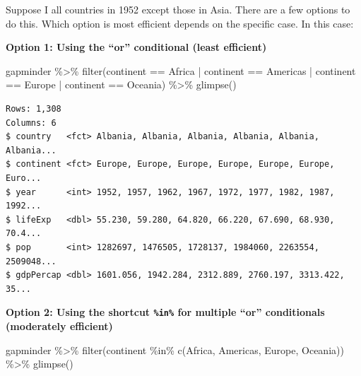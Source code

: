 \documentclass[
]{book}
\makeatletter
\newenvironment{Shaded}{\begin{snugshade}}{\end{snugshade}}
\newcommand{\FunctionTok}[1]{\textcolor[rgb]{0,0,0}{#1}}
\newcommand{\NormalTok}[1]{#1}
\newcommand{\SpecialCharTok}[1]{\textcolor[rgb]{0,0,0}{#1}}
\newcommand{\StringTok}[1]{\textcolor[rgb]{0.5,0.5,0.5}{#1}}
\newenvironment{kframe}{%
\medskip{}
\setlength{\fboxsep}{.8em}
 \def\at@end@of@kframe{}%
 \ifinner\ifhmode%
  \def\at@end@of@kframe{\end{minipage}}%
  \begin{minipage}{\columnwidth}%
 \fi\fi%
 \def\FrameCommand##1{\hskip\@totalleftmargin \hskip-\fboxsep
 \colorbox{shadecolor}{##1}\hskip-\fboxsep
     \hskip-\linewidth \hskip-\@totalleftmargin \hskip\columnwidth}%
 \MakeFramed {\advance\hsize-\width
   \@totalleftmargin\z@ \linewidth\hsize
   \@setminipage}}%
 {\par\unskip\endMakeFramed%
 \at@end@of@kframe}
\renewenvironment{Shaded}{\begin{kframe}}{\end{kframe}}
\makeatother
\begin{document}
Suppose I all countries in 1952 except those in Asia. There are a few options to do this. Which option is most efficient depends on the specific case. In this case:

\textbf{Option 1: Using the ``or'' conditional \texttt{\textbar{}} (least efficient)}

\begin{Shaded}
\begin{Highlighting}[]
\NormalTok{gapminder }\SpecialCharTok{\%\textgreater{}\%} 
  \FunctionTok{filter}\NormalTok{(continent }\SpecialCharTok{==} \StringTok{\textquotesingle{}Africa\textquotesingle{}} \SpecialCharTok{|}\NormalTok{ continent }\SpecialCharTok{==} \StringTok{\textquotesingle{}Americas\textquotesingle{}} \SpecialCharTok{|}\NormalTok{ continent }\SpecialCharTok{==} \StringTok{\textquotesingle{}Europe\textquotesingle{}} \SpecialCharTok{|}\NormalTok{ continent }\SpecialCharTok{==} \StringTok{\textquotesingle{}Oceania\textquotesingle{}}\NormalTok{) }\SpecialCharTok{\%\textgreater{}\%} 
  \FunctionTok{glimpse}\NormalTok{()}
\end{Highlighting}
\end{Shaded}

\begin{verbatim}
Rows: 1,308
Columns: 6
$ country   <fct> Albania, Albania, Albania, Albania, Albania, Albania...
$ continent <fct> Europe, Europe, Europe, Europe, Europe, Europe, Euro...
$ year      <int> 1952, 1957, 1962, 1967, 1972, 1977, 1982, 1987, 1992...
$ lifeExp   <dbl> 55.230, 59.280, 64.820, 66.220, 67.690, 68.930, 70.4...
$ pop       <int> 1282697, 1476505, 1728137, 1984060, 2263554, 2509048...
$ gdpPercap <dbl> 1601.056, 1942.284, 2312.889, 2760.197, 3313.422, 35...
\end{verbatim}

\textbf{Option 2: Using the shortcut \texttt{\%in\%} for multiple ``or'' conditionals (moderately efficient)}

\begin{Shaded}
\begin{Highlighting}[]
\NormalTok{gapminder }\SpecialCharTok{\%\textgreater{}\%} 
  \FunctionTok{filter}\NormalTok{(continent }\SpecialCharTok{\%in\%} \FunctionTok{c}\NormalTok{(}\StringTok{\textquotesingle{}Africa\textquotesingle{}}\NormalTok{, }\StringTok{\textquotesingle{}Americas\textquotesingle{}}\NormalTok{, }\StringTok{\textquotesingle{}Europe\textquotesingle{}}\NormalTok{, }\StringTok{\textquotesingle{}Oceania\textquotesingle{}}\NormalTok{)) }\SpecialCharTok{\%\textgreater{}\%} 
  \FunctionTok{glimpse}\NormalTok{()}
\end{Highlighting}
\end{Shaded}
\end{document}
